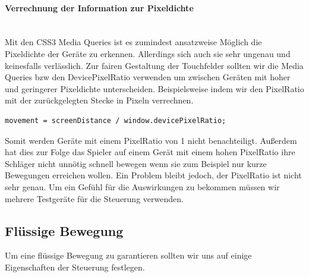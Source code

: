 \paragraph{Verrechnung der Information zur Pixeldichte} 
\mbox{}\\
Mit den CSS3 Media Queries ist es zumindest ansatzweise Möglich die Pixeldichte der Geräte zu erkennen. Allerdings sich auch sie sehr ungenau und keinesfalls verlässlich.
\newline
Zur fairen Gestaltung der Touchfelder sollten wir die Media Queries bzw den DevicePixelRatio verwenden um zwischen Geräten mit hoher und geringerer Pixeldichte unterscheiden.
\newline
Beispielsweise indem wir den PixelRatio mit der zurückgelegten Stecke in Pixeln verrechnen.
\begin{lstlisting}
movement = screenDistance / window.devicePixelRatio;
\end{lstlisting}
Somit werden Geräte mit einem PixelRatio von 1 nicht benachteiligt. Außerdem hat dies zur Folge das Spieler auf einem Gerät mit einem hohen PixelRatio ihre Schläger nicht unnötig schnell bewegen wenn sie zum Beispiel nur kurze Bewegungen erreichen wollen.
\newline 
Ein Problem bleibt jedoch, der PixelRatio ist nicht sehr genau. Um ein Gefühl für die Auswirkungen zu bekommen müssen wir mehrere Testgeräte für die Steuerung verwenden.
\subsection{Flüssige Bewegung}
Um eine flüssige Bewegung zu garantieren sollten wir uns auf einige Eigenschaften der Steuerung festlegen.
